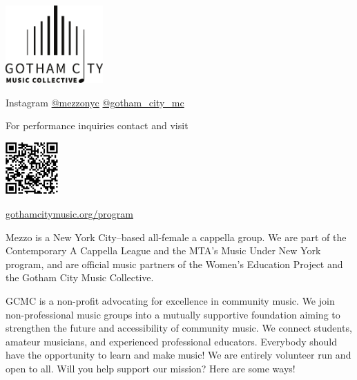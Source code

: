 \documentclass{article}[10pt]
\newcommand{\logo}{
        {\includegraphics[width=0.28\textwidth]{../graphic_design_assets/bw_logo_full}}
}
\newcommand{\tunespacefront}{\vspace{0.1in}}
\newcommand{\tunespaceback}{\vspace{0.1in}}
\begin{document}
    \begin{center}
    {\logo}

        \tunespacefront

        \begin{minipage}{4.2in}

            \begin{center}

                \faInstagram{}{} Instagram \href{https://www.instagram.com/mezzonyc}{@mezzonyc} \href{https://www.instagram.com/gotham_city_mc/}{@gotham\_city\_mc}

                For performance inquiries contact
                    {\textbf{}}
                and visit
                    {\textbf{}}
            \end{center}

            \begin{center}
            {\textbf{}}

                \tunespaceback

                {\includegraphics[width=0.15\textwidth]{../graphic_design_assets/gotham_city_music_collective_program.png}}

                \href{https://gothamcitymusic.org/program}{gothamcitymusic.org/program}
            \end{center}

            \begin{small}
                Mezzo is a New York City–based all-female a cappella group.
                We are part of the Contemporary A Cappella League and the MTA's Music Under New York program,
                and are official music partners of the Women's Education Project and the Gotham City Music Collective.

                GCMC is a non-profit advocating for excellence in community music.
                We join non-professional music groups into a mutually supportive foundation aiming
                to strengthen the future and accessibility of community music.
                We connect students, amateur musicians, and experienced professional educators.
                Everybody should have the opportunity to learn and make music!
                We are entirely volunteer run and open to all.
                Will you help support our mission?
                Here are some ways!
            \end{small}


\end{minipage}
\end{center}
\end{document}

